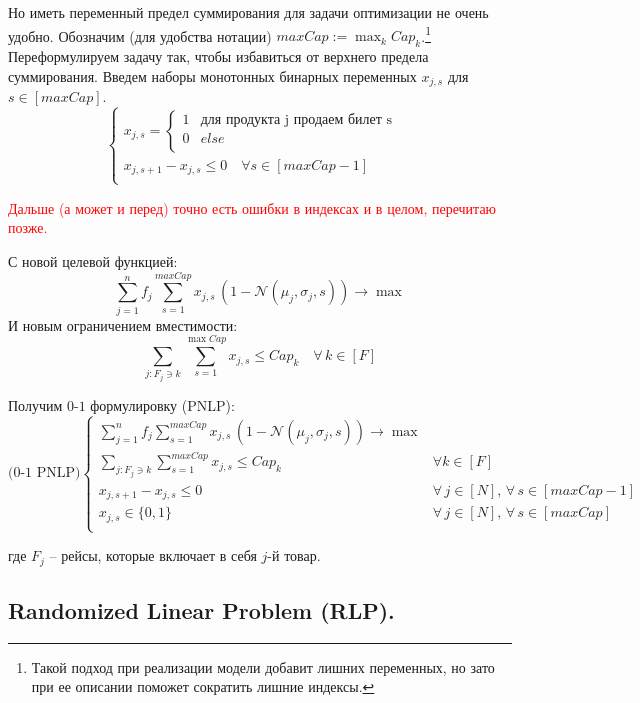\documentclass[reqno]{article}
\theoremstyle{definition}
\theoremstyle{definition}
\theoremstyle{definition}
\theoremstyle{definition}
\theoremstyle{definition}
\theoremstyle{definition}
\theoremstyle{definition}
\theoremstyle{definition}
\theoremstyle{definition}
\begin{document}
		Но иметь переменный предел суммирования для задачи оптимизации не очень удобно. Обозначим (для удобства нотации) $maxCap := \max_k Cap_k$.\footnote{Такой подход при реализации модели добавит лишних переменных, но зато при ее описании поможет сократить лишние индексы.} Переформулируем задачу так, чтобы избавиться от верхнего предела суммирования. Введем наборы монотонных бинарных переменных $x_{j,s}$ для $s \in [maxCap]$.
		$$
		\begin{cases}
			x_{j,s} =
		\begin{cases}
			1 & \text{для продукта j продаем билет s}\\
			0 & else\\
		\end{cases} & \\
		x_{j,s + 1} - x_{j, s} \leq 0\quad \forall s \in [maxCap - 1] & \\
		\end{cases}
		$$
		
		\textcolor{red}{Дальше (а может и перед) точно есть ошибки в индексах и в целом, перечитаю позже.}
		
		С новой целевой функцией:
		$$\sum\limits^n_{j = 1} f_j \sum\limits^{maxCap}_{s = 1} x_{j, s}\,(1 - \mathcal{N}(\mu_j, \sigma_j, s)) \rightarrow \max$$
		И новым ограничением вместимости:
		$$\sum\limits_{j : F_j \ni k} \sum\limits^{\max Cap}_{s = 1} x_{j, s} \leq Cap_k \quad \forall\, k \in [F]$$
		
		Получим $0$-$1$ формулировку (PNLP):
		$$
		\text{(0-1 PNLP)}
		\begin{cases}
			\sum\limits^n_{j = 1} f_j \sum\limits^{maxCap}_{s = 1} x_{j, s}\,(1 - \mathcal{N}(\mu_j, \sigma_j, s)) \rightarrow \max & \\
			\sum\limits_{j : F_j \ni k} \sum\limits^{maxCap}_{s = 1} x_{j, s} \leq Cap_k & \forall k \in [F] \\
			x_{j,s + 1} - x_{j, s} \leq 0 \quad & \forall\, j \in [N],\, \forall\, s \in [maxCap - 1] \\
			x_{j, s} \in \{0, 1\} &  \forall\, j \in [N],\, \forall\, s \in [maxCap] \\
		\end{cases}
		$$
		
		где $F_j$ -- рейсы, которые включает в себя $j$-й товар.
		
		\subsection{Randomized Linear Problem (RLP).}
		
\end{document}
